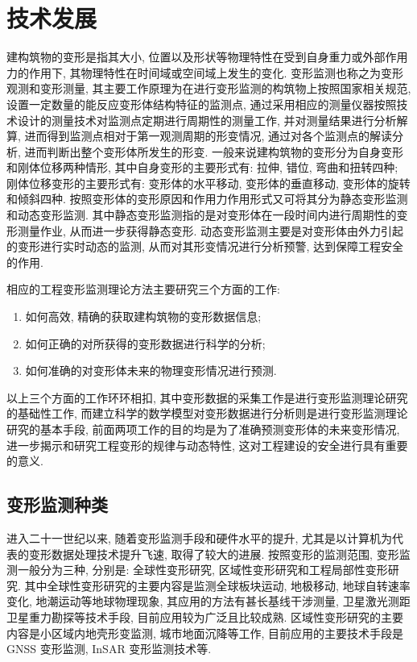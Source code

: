 \section{技术发展}

建构筑物的变形是指其大小, 位置以及形状等物理特性在受到自身重力或外部作用力的作用下, 其物理特性在时间域或空间域上发生的变化. 变形监测也称之为变形观测和变形测量, 其主要工作原理为在进行变形监测的构筑物上按照国家相关规范, 设置一定数量的能反应变形体结构特征的监测点, 通过采用相应的测量仪器按照技术设计的测量技术对监测点定期进行周期性的测量工作, 并对测量结果进行分析解算, 进而得到监测点相对于第一观测周期的形变情况, 通过对各个监测点的解读分析, 进而判断出整个变形体所发生的形变. 一般来说建构筑物的变形分为自身变形和刚体位移两种情形, 其中自身变形的主要形式有: 拉伸, 错位, 弯曲和扭转四种; 刚体位移变形的主要形式有: 变形体的水平移动, 变形体的垂直移动, 变形体的旋转和倾斜四种. 按照变形体的变形原因和作用力作用形式又可将其分为静态变形监测和动态变形监测. 其中静态变形监测指的是对变形体在一段时间内进行周期性的变形测量作业, 从而进一步获得静态变形. 动态变形监测主要是对变形体由外力引起的变形进行实时动态的监测, 从而对其形变情况进行分析预警, 达到保障工程安全的作用. 

相应的工程变形监测理论方法主要研究三个方面的工作:
\begin{enumerate}
    \item 如何高效, 精确的获取建构筑物的变形数据信息; 
    \item 如何正确的对所获得的变形数据进行科学的分析; 
    \item 如何准确的对变形体未来的物理变形情况进行预测.
\end{enumerate}

以上三个方面的工作环环相扣, 其中变形数据的采集工作是进行变形监测理论研究的基础性工作, 而建立科学的数学模型对变形数据进行分析则是进行变形监测理论研究的基本手段, 前面两项工作的目的均是为了准确预测变形体的未来变形情况, 进一步揭示和研究工程变形的规律与动态特性, 这对工程建设的安全进行具有重要的意义. 

\subsection{变形监测种类}
进入二十一世纪以来, 随着变形监测手段和硬件水平的提升, 尤其是以计算机为代表的变形数据处理技术提升飞速, 取得了较大的进展. 按照变形的监测范围, 变形监测一般分为三种, 分别是: 全球性变形研究, 区域性变形研究和工程局部性变形研究. 其中全球性变形研究的主要内容是监测全球板块运动, 地极移动, 地球自转速率变化, 地潮运动等地球物理现象, 其应用的方法有甚长基线干涉测量, 卫星激光测距卫星重力勘探等技术手段, 目前应用较为广泛且比较成熟. 区域性变形研究的主要内容是小区域内地壳形变监测, 城市地面沉降等工作, 目前应用的主要技术手段是GNSS 变形监测, InSAR 变形监测技术等. 

